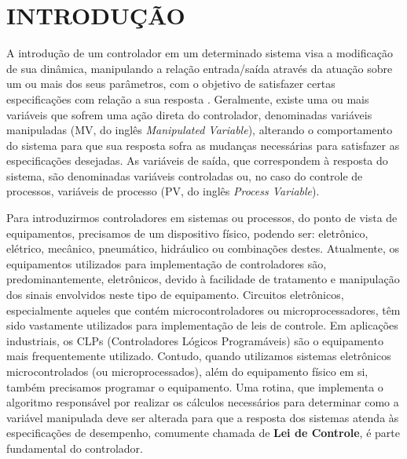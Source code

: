 \documentclass[a4paper,12pt]{article}
\begin{document}
\newpage




\begin{center}
\tableofcontents
\end{center}

\newpage


\thispagestyle{main}

\section{INTRODUÇÃO}

\begin{flushleft}

\begin{flushleft}
\hspace{4ex}A introdução de um controlador em um determinado sistema visa a modificação de sua dinâmica, manipulando a relação entrada/saída através da atuação sobre um ou mais dos seus parâmetros, com o objetivo de satisfazer certas especificações com relação a sua resposta \cite{katsuhiko1993engineering}. Geralmente, existe uma ou mais variáveis que sofrem uma ação direta do controlador, denominadas variáveis manipuladas (MV, do inglês \textit{Manipulated Variable}), alterando o comportamento do sistema para que sua resposta sofra as mudanças necessárias para satisfazer as especificações desejadas. As variáveis de saída, que correspondem à resposta do sistema, são denominadas variáveis controladas ou, no caso do controle de processos, variáveis de processo (PV, do inglês \textit{Process Variable}). 

\hspace{4ex}Para introduzirmos controladores em sistemas ou processos, do ponto de vista de equipamentos, precisamos de um dispositivo físico, podendo ser: eletrônico, elétrico, mecânico, pneumático, hidráulico ou combinações destes. Atualmente, os equipamentos utilizados para implementação de controladores são, predominantemente, eletrônicos, devido à facilidade de tratamento e manipulação dos sinais envolvidos neste tipo de equipamento. Circuitos eletrônicos, especialmente aqueles que contém microcontroladores ou microprocessadores, têm sido vastamente utilizados para implementação de leis de controle. Em aplicações industriais, os CLPs (Controladores Lógicos Programáveis) são o equipamento mais frequentemente utilizado. Contudo, quando utilizamos sistemas eletrônicos microcontrolados (ou microprocessados), além do equipamento físico em si, também precisamos programar o equipamento. Uma rotina, que implementa o algoritmo responsável por realizar os cálculos necessários para determinar como a variável manipulada deve ser alterada para que a resposta dos sistemas atenda às especificações de desempenho, comumente chamada de \textbf{Lei de Controle}, é parte fundamental do controlador. 


\end{flushleft}
\end{flushleft}
\end{document}
